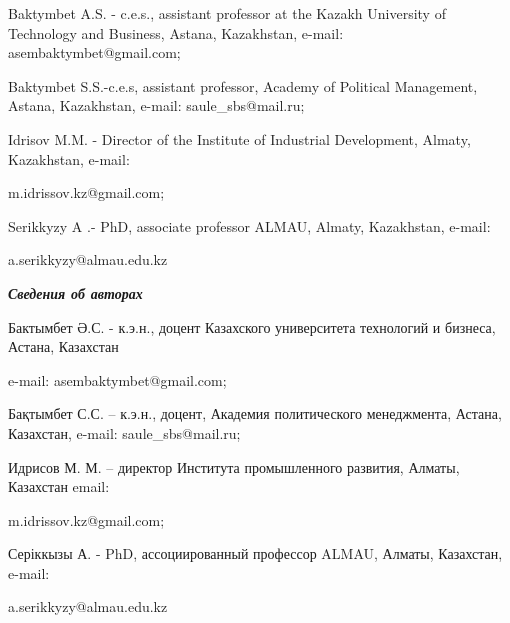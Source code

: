 \begin{noparindent}
Baktymbet A.S. - c.e.s., assistant professor at the Kazakh University of
Technology and Business, Astana, Kazakhstan, e-mail:
asembaktymbet@gmail.com;

Baktymbet S.S.-c.e.s, assistant professor, Academy of Political
Management, Astana, Kazakhstan, e-mail: saule\_sbs@mail.ru;

Idrisov M.M. - Director of the Institute of Industrial Development,
Almaty, Kazakhstan, e-mail:

m.idrissov.kz@gmail.com;

Serikkyzy A .- PhD, associate professor ALMAU, Almaty, Kazakhstan,
e-mail:

a.serikkyzy@almau.edu.kz
\end{noparindent}

\emph{{\bfseries Сведения об авторах}}

\begin{noparindent}
Бактымбет Ә.С. - к.э.н., доцент Казахского университета технологий и
бизнеса, Астана, Казахстан

e-mail: asembaktymbet@gmail.com;

Бақтымбет С.С. -- к.э.н., доцент, Академия политического менеджмента,
Астана, Казахстан, e-mail: saule\_sbs@mail.ru;

Идрисов М. М. -- директор Института промышленного развития, Алматы,
Казахстан email:

m.idrissov.kz@gmail.com;

Серіккызы А. - PhD, ассоциированный профессор ALMAU, Алматы, Казахстан,
e-mail:

a.serikkyzy@almau.edu.kz
\end{noparindent}
